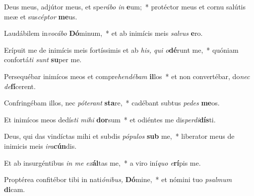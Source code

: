 \documentclass[a4paper, twoside, 12pt]{article}
\begin{document}
\hicSuntNeumae



\trCommunio



%

\begin{psalmus}
Deus meus, adjútor meus, et spe\emph{rábo in }\textbf{e}\-um;~*  
protéctor meus et cornu salútis meæ et sus\emph{céptor }\textbf{me}\-us.

Laudábilem in\emph{vocábo }\textbf{Dó}\-minum,~* 
et ab inimícis meis \emph{salvus }\textbf{e}\-ro.

Erípuit me de inimícis meis fortíssimis et ab \emph{his, qui o}\textbf{dé}\-runt me,~* 
quóniam confortá\emph{ti sunt }\textbf{su}\-per me.

Persequébar inimícos meos et compre\emph{hendébam }\textbf{il}\-los~* 
et non convertébar, do\emph{nec de}\textbf{fí}\-cerent.

Confringébam illos, nec \emph{póterant }\textbf{sta}\-re,~* 
cadébant subtus \emph{pedes }\textbf{me}\-os.

Et inimícos meos dedís\emph{ti mi\-hi }\textbf{dor}\-sum~* 
et odiéntes me dis\emph{per\-di}\textbf{dís}\-ti.

Deus, qui das vindíctas mihi et subdis \emph{pó\-pulos }\textbf{sub} me,~* 
liberator meus de inimicis meis \emph{i\-ra}\textbf{cún}\-dis.

Et ab insurgéntibus \emph{in me ex}\textbf{ál}\-tas me,~* 
a viro iní\emph{\-quo e}\textbf{rí}\-pis me.

Proptérea confitébor tibi in nati\emph{ó\-nibus, }\textbf{Dó}\-mine,~* 
et nómini tuo \emph{psal\-mum }\textbf{di}\-cam.
\end{psalmus}


\vfill

\pagebreak

\pagestyle{empty}

\tableofcontents

\vspace{3cm}
\end{document}
